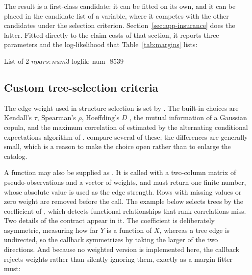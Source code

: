 \documentclass[article]{jss}
\begin{document}
The result is a first-class candidate: it can be fitted on its own, and it can
be placed in the candidate list of a variable, where it competes with the
other candidates under the selection criterion.
Section~\ref{sec:app-insurance} does the latter.  Fitted directly to the claim
costs of that section, it reports three parameters and the log-likelihood
that Table~\ref{tab:margins} lists:

\begin{CodeChunk}
\begin{CodeOutput}
List of 2
 $ npars : num 3
 $ loglik: num -8539
\end{CodeOutput}
\end{CodeChunk}

\subsection{Custom tree-selection criteria}\label{sec:treecrit}

The edge weight used in structure selection is set by .  The
built-in choices are Kendall's $\tau$, Spearman's $\rho$, Hoeffding's $D$
\citep{hoeffding1948}, the mutual information of a Gaussian copula, and the
maximum correlation of \citet{renyi1959} estimated by the alternating
conditional expectations algorithm of \citet{breiman1985}.  \citet{czado2013}
compare several of these; the differences are generally small, which is a
reason to make the choice open rather than to enlarge the catalog.

A function may also be supplied as .  It is called with a
two-column matrix of pseudo-observations and a vector of weights, and must
return one finite number, whose absolute value is used as the edge strength.  Rows with
missing values or zero weight are removed before the call.  The example below
selects trees by the coefficient of \citet{chatterjee2021}, which detects
functional relationships that rank correlations miss.  Two details of the
contract appear in it.  The coefficient is deliberately
asymmetric, measuring how far $Y$ is a function of $X$, whereas a tree
edge is undirected, so the callback symmetrizes by taking the larger of the two
directions.  And because no weighted version is implemented here, the callback
rejects weights rather than silently ignoring them, exactly as a margin fitter
must:
\end{document}
